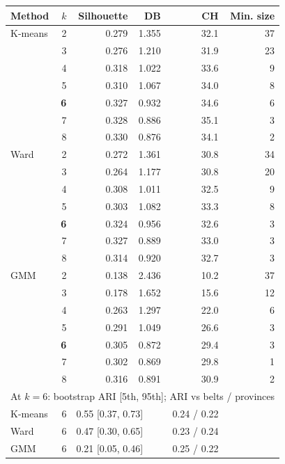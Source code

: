 \begin{tabular}{lrrrrr}
\toprule
Method & $k$ & Silhouette & DB & CH & Min. size \\
\midrule
K-means & 2 & 0.279 & 1.355 & 32.1 & 37 \\
 & 3 & 0.276 & 1.210 & 31.9 & 23 \\
 & 4 & 0.318 & 1.022 & 33.6 & 9 \\
 & 5 & 0.310 & 1.067 & 34.0 & 8 \\
 & \textbf{6} & 0.327 & 0.932 & 34.6 & 6 \\
 & 7 & 0.328 & 0.886 & 35.1 & 3 \\
 & 8 & 0.330 & 0.876 & 34.1 & 2 \\
\addlinespace[2pt]
Ward & 2 & 0.272 & 1.361 & 30.8 & 34 \\
 & 3 & 0.264 & 1.177 & 30.8 & 20 \\
 & 4 & 0.308 & 1.011 & 32.5 & 9 \\
 & 5 & 0.303 & 1.082 & 33.3 & 8 \\
 & \textbf{6} & 0.324 & 0.956 & 32.6 & 3 \\
 & 7 & 0.327 & 0.889 & 33.0 & 3 \\
 & 8 & 0.314 & 0.920 & 32.7 & 3 \\
\addlinespace[2pt]
GMM & 2 & 0.138 & 2.436 & 10.2 & 37 \\
 & 3 & 0.178 & 1.652 & 15.6 & 12 \\
 & 4 & 0.263 & 1.297 & 22.0 & 6 \\
 & 5 & 0.291 & 1.049 & 26.6 & 3 \\
 & \textbf{6} & 0.305 & 0.872 & 29.4 & 3 \\
 & 7 & 0.302 & 0.869 & 29.8 & 1 \\
 & 8 & 0.316 & 0.891 & 30.9 & 2 \\
\midrule
\multicolumn{6}{l}{At $k=6$: bootstrap ARI [5th, 95th]; ARI vs belts / provinces} \\
K-means & 6 & \multicolumn{2}{l}{0.55 [0.37, 0.73]} & 0.24 / 0.22 & \\
Ward & 6 & \multicolumn{2}{l}{0.47 [0.30, 0.65]} & 0.23 / 0.24 & \\
GMM & 6 & \multicolumn{2}{l}{0.21 [0.05, 0.46]} & 0.25 / 0.22 & \\
\bottomrule
\end{tabular}
